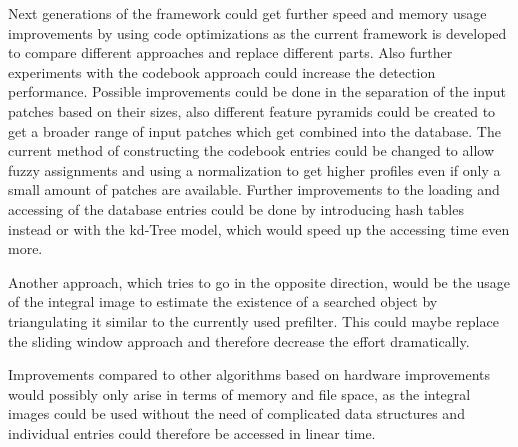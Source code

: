 Next generations of the framework could get further speed and memory usage improvements by using code optimizations as the current framework is developed to compare different approaches and replace different parts. Also further experiments with the codebook approach could increase the detection performance. Possible improvements could be done in the separation of the input patches based on their sizes, also different feature pyramids could be created to get a broader range of input patches which get combined into the database. The current method of constructing the codebook entries could be changed to allow fuzzy assignments and using a normalization to get higher profiles even if only a small amount of patches are available. Further improvements to the loading and accessing of the database entries could be done by introducing hash tables instead or with the kd-Tree model, which would speed up the accessing time even more.

Another approach, which tries to go in the opposite direction, would be the usage of the integral image to estimate the existence of a searched object by triangulating it similar to the currently used prefilter. This could maybe replace the sliding window approach and therefore decrease the effort dramatically.

Improvements compared to other algorithms based on hardware improvements would possibly only arise in terms of memory and file space, as the integral images could be used without the need of complicated data structures and individual entries could therefore be accessed in linear time.